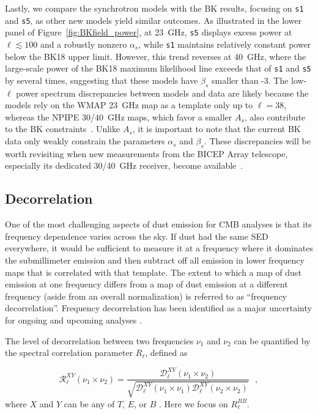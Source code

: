 \documentclass[twocolumn]{aastex631}
\begin{document}
Lastly, we compare the synchrotron models with the BK results, focusing on \texttt{s1} and \texttt{s5}, as other new models yield similar outcomes. As illustrated in the lower panel of Figure~\ref{fig:BKfield_power}, at 23~GHz, \texttt{s5} displays excess power at $\ell \lesssim 100$ and a robustly nonzero $\alpha_s$, while \texttt{s1} maintains relatively constant power below the BK18 upper limit. However, this trend reverses at 40~GHz, where the large-scale power of the BK18 maximum likelihood line exceeds that of \texttt{s1} and \texttt{s5} by several times, suggesting that these models have $\beta_s$ smaller than -3. The low-$\ell$ power spectrum discrepancies between models and data are likely because the models rely on the WMAP 23~GHz map as a template only up to $\ell = 38$, whereas the NPIPE 30/40~GHz maps, which favor a smaller $A_s$, also contribute to the BK constraints~\citep[][Figure~21]{Ade:2021}. Unlike $A_s$, it is important to note that the current BK data only weakly constrain the parameters $\alpha_s$ and $\beta_s$. These discrepancies will be worth revisiting when new measurements from the BICEP Array telescope, especially its dedicated 30/40~GHz receiver, become available~\citep{Moncelsi:2020}.

\subsection{Decorrelation} \label{subsec:decorrelation}

One of the most challenging aspects of dust emission for CMB analyses is that its frequency dependence varies across the sky. If dust had the same SED everywhere, it would be sufficient to measure it at a frequency where it dominates the submillimeter emission and then subtract off all emission in lower frequency maps that is correlated with that template. The extent to which a map of dust emission at one frequency differs from a map of dust emission at a different frequency (aside from an overall normalization) is referred to as ``frequency decorrelation''. Frequency decorrelation has been identified as a major uncertainty for ongoing and upcoming analyses \citep{Ade:2021}.

The level of decorrelation between two frequencies $\nu_1$ and $\nu_2$ can be quantified by the spectral correlation parameter $R_\ell$, defined as

\begin{equation} \label{eq:R_ell}
    \mathcal{R}^{XY}_\ell(\nu_1\times\nu_2) = \frac{\mathcal{D}_\ell^{XY}(\nu_1\times\nu_2)}{\sqrt{\mathcal{D}_\ell^{XY}(\nu_1\times\nu_1)\mathcal{D}_\ell^{XY}(\nu_2\times\nu_2)}}
    ~~~,
\end{equation}
where $X$ and $Y$ can be any of $T$, $E$, or $B$ \citep{planck2016-L}. Here we focus on $R_\ell^{BB}$.
\end{document}

